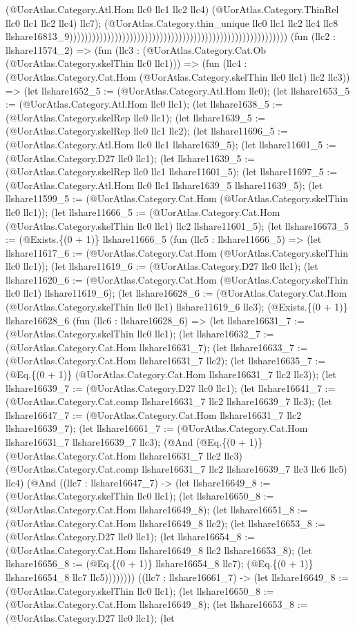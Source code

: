\documentclass[11pt]{article}
\begin{document}
(@UorAtlas.Category.Atl.Hom llc0 llc1 llc2 llc4) (@UorAtlas.Category.ThinRel llc0 llc1 llc2 llc4) llc7); (@UorAtlas.Category.thin\_unique llc0 llc1 llc2 llc4 llc8 llshare16813\_9)))))))))))))))))))))))))))))))))))))))))))))))))))))))))) (fun (llc2 : llshare11574\_2) => (fun (llc3 : (@UorAtlas.Category.Cat.Ob (@UorAtlas.Category.skelThin llc0 llc1))) => (fun (llc4 : (@UorAtlas.Category.Cat.Hom (@UorAtlas.Category.skelThin llc0 llc1) llc2 llc3)) => (let llshare1652\_5 := (@UorAtlas.Category.Atl.Hom llc0); (let llshare1653\_5 := (@UorAtlas.Category.Atl.Hom llc0 llc1); (let llshare1638\_5 := (@UorAtlas.Category.skelRep llc0 llc1); (let llshare1639\_5 := (@UorAtlas.Category.skelRep llc0 llc1 llc2); (let llshare11696\_5 := (@UorAtlas.Category.Atl.Hom llc0 llc1 llshare1639\_5); (let llshare11601\_5 := (@UorAtlas.Category.D27 llc0 llc1); (let llshare11639\_5 := (@UorAtlas.Category.skelRep llc0 llc1 llshare11601\_5); (let llshare11697\_5 := (@UorAtlas.Category.Atl.Hom llc0 llc1 llshare1639\_5 llshare11639\_5); (let llshare11599\_5 := (@UorAtlas.Category.Cat.Hom (@UorAtlas.Category.skelThin llc0 llc1)); (let llshare11666\_5 := (@UorAtlas.Category.Cat.Hom (@UorAtlas.Category.skelThin llc0 llc1) llc2 llshare11601\_5); (let llshare16673\_5 := (@Exists.\{(0 + 1)\} llshare11666\_5 (fun (llc5 : llshare11666\_5) => (let llshare11617\_6 := (@UorAtlas.Category.Cat.Hom (@UorAtlas.Category.skelThin llc0 llc1)); (let llshare11619\_6 := (@UorAtlas.Category.D27 llc0 llc1); (let llshare11620\_6 := (@UorAtlas.Category.Cat.Hom (@UorAtlas.Category.skelThin llc0 llc1) llshare11619\_6); (let llshare16628\_6 := (@UorAtlas.Category.Cat.Hom (@UorAtlas.Category.skelThin llc0 llc1) llshare11619\_6 llc3); (@Exists.\{(0 + 1)\} llshare16628\_6 (fun (llc6 : llshare16628\_6) => (let llshare16631\_7 := (@UorAtlas.Category.skelThin llc0 llc1); (let llshare16632\_7 := (@UorAtlas.Category.Cat.Hom llshare16631\_7); (let llshare16633\_7 := (@UorAtlas.Category.Cat.Hom llshare16631\_7 llc2); (let llshare16635\_7 := (@Eq.\{(0 + 1)\} (@UorAtlas.Category.Cat.Hom llshare16631\_7 llc2 llc3)); (let llshare16639\_7 := (@UorAtlas.Category.D27 llc0 llc1); (let llshare16641\_7 := (@UorAtlas.Category.Cat.comp llshare16631\_7 llc2 llshare16639\_7 llc3); (let llshare16647\_7 := (@UorAtlas.Category.Cat.Hom llshare16631\_7 llc2 llshare16639\_7); (let llshare16661\_7 := (@UorAtlas.Category.Cat.Hom llshare16631\_7 llshare16639\_7 llc3); (@And (@Eq.\{(0 + 1)\} (@UorAtlas.Category.Cat.Hom llshare16631\_7 llc2 llc3) (@UorAtlas.Category.Cat.comp llshare16631\_7 llc2 llshare16639\_7 llc3 llc6 llc5) llc4) (@And ((llc7 : llshare16647\_7) -> (let llshare16649\_8 := (@UorAtlas.Category.skelThin llc0 llc1); (let llshare16650\_8 := (@UorAtlas.Category.Cat.Hom llshare16649\_8); (let llshare16651\_8 := (@UorAtlas.Category.Cat.Hom llshare16649\_8 llc2); (let llshare16653\_8 := (@UorAtlas.Category.D27 llc0 llc1); (let llshare16654\_8 := (@UorAtlas.Category.Cat.Hom llshare16649\_8 llc2 llshare16653\_8); (let llshare16656\_8 := (@Eq.\{(0 + 1)\} llshare16654\_8 llc7); (@Eq.\{(0 + 1)\} llshare16654\_8 llc7 llc5)))))))) ((llc7 : llshare16661\_7) -> (let llshare16649\_8 := (@UorAtlas.Category.skelThin llc0 llc1); (let llshare16650\_8 := (@UorAtlas.Category.Cat.Hom llshare16649\_8); (let llshare16653\_8 := (@UorAtlas.Category.D27 llc0 llc1); (let 
\end{document}

